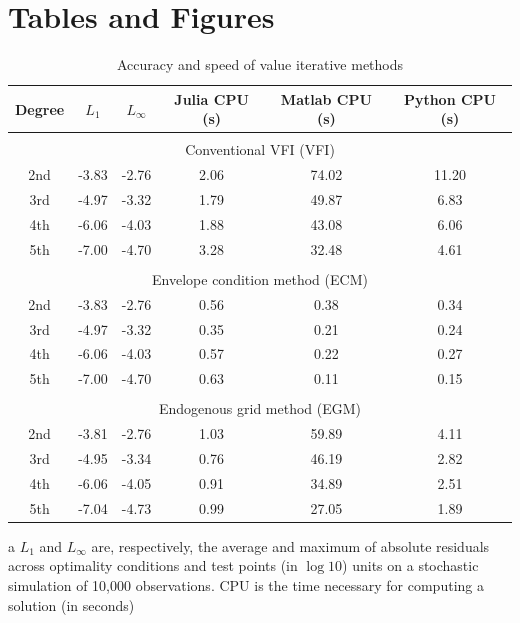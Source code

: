 
\section{Tables and Figures}

\begin{table}[tph]
  \caption{Accuracy and speed of value iterative methods}
  \label{clmm:Table1}\vspace{-0.3cm}
  \par
  \begin{center}
  \begin{threeparttable}
{\footnotesize
  \begin{tabular}{c|cc|ccc}
    \hline \hline
    Degree & $L_1$ & $L_\infty$ & Julia CPU (s) & Matlab CPU (s) & Python CPU (s) \\ \hline
    \multicolumn{6}{c}{} \\
    \multicolumn{6}{c}{Conventional VFI (VFI)} \\ \hline
    2nd &  -3.83 & -2.76 & 2.06 & 74.02 & 11.20 \\
    3rd &  -4.97 & -3.32 & 1.79 & 49.87 & 6.83 \\
    4th &  -6.06 & -4.03 & 1.88 & 43.08 & 6.06 \\
    5th &  -7.00 & -4.70 & 3.28 & 32.48 & 4.61 \\ \hline
    \multicolumn{6}{c}{} \\
    \multicolumn{6}{c}{Envelope condition method (ECM)} \\ \hline
    2nd & -3.83 & -2.76 & 0.56 & 0.38 & 0.34 \\
    3rd & -4.97 & -3.32 & 0.35 & 0.21 & 0.24 \\
    4th & -6.06 & -4.03 & 0.57 & 0.22 & 0.27 \\
    5th & -7.00 & -4.70 & 0.63 & 0.11 & 0.15 \\ \hline
    \multicolumn{6}{c}{} \\
    \multicolumn{6}{c}{Endogenous grid method (EGM)} \\ \hline
    2nd & -3.81 & -2.76 & 1.03 & 59.89 & 4.11 \\
    3rd & -4.95 & -3.34 & 0.76 & 46.19 & 2.82 \\
    4th & -6.06 & -4.05 & 0.91 & 34.89 & 2.51 \\
    5th & -7.04 & -4.73 & 0.99 & 27.05 & 1.89 \\ \hline
  \end{tabular}%
  \begin{tablenotes}
    \item[a] $L_1$ and $L_\infty$ are, respectively, the average and maximum of
    absolute residuals across optimality conditions and test points (in $\log
    10$) units on a stochastic simulation of 10,000 observations. CPU is the
    time necessary for computing a solution (in seconds)
  \end{tablenotes}
}  %
  \end{threeparttable}
  \end{center}
  \par
\end{table}

